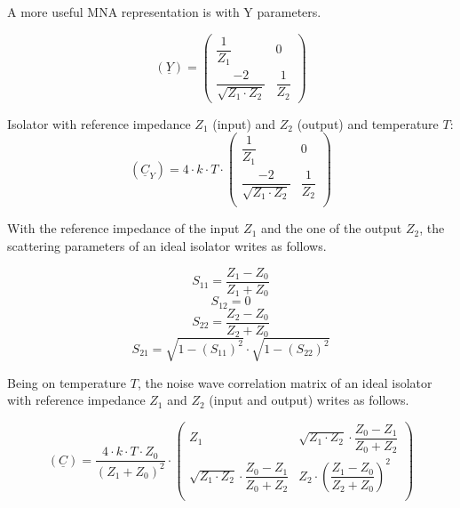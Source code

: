 A more useful MNA representation is with Y parameters.

\begin{equation}
(\underline{Y}) =
\begin{pmatrix}
 \dfrac{1}{Z_1} & 0 \\
 \dfrac{-2}{\sqrt{Z_1\cdot Z_2}} & \dfrac{1}{Z_2}
\end{pmatrix}
\end{equation}

Isolator with reference impedance $Z_1$ (input) and $Z_2$ (output) and
temperature $T$:
\begin{equation}
(\underline{C}_Y) = 4\cdot k\cdot T\cdot
\begin{pmatrix}
 \dfrac{1}{Z_1} & 0 \\
 \dfrac{-2}{\sqrt{Z_1\cdot Z_2}} &  \dfrac{1}{Z_2} \\
\end{pmatrix}
\end{equation}

With the reference impedance of the
input $Z_1$ and the one of the output $Z_2$, the scattering parameters
of an ideal isolator writes as follows.

\begin{equation}
S_{11} = \frac{Z_1-Z_0}{Z_1+Z_0}
\end{equation}
\begin{equation}
S_{12} = 0
\end{equation}
\begin{equation}
S_{22} = \frac{Z_2-Z_0}{Z_2+Z_0}
\end{equation}
\begin{equation}
S_{21} = \sqrt{1-(S_{11})^2}\cdot\sqrt{1-(S_{22})^2}
\end{equation}

Being on temperature $T$, the noise wave correlation matrix of an
ideal isolator with reference impedance $Z_1$ and $Z_2$ (input and
output) writes as follows.

\begin{equation}
(\underline{C}) = \frac{4\cdot k\cdot T\cdot Z_0}{(Z_1+Z_0)^2}\cdot
\begin{pmatrix}
  Z_1 & \sqrt{Z_1\cdot Z_2}\cdot\dfrac{Z_0-Z_1}{Z_0+Z_2}\\
  \sqrt{Z_1\cdot Z_2}\cdot\dfrac{Z_0-Z_1}{Z_0+Z_2} & Z_2\cdot\left(\dfrac{Z_1-Z_0}{Z_2+Z_0}\right)^2\\
\end{pmatrix}
\end{equation}


